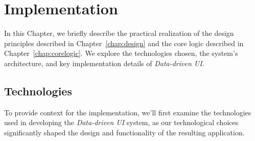 \chapter{Implementation}
\label{chap:implementation}

In this Chapter, we briefly describe the practical realization of the design principles described in Chapter~\ref{chap:design} and the core logic described in Chapter~\ref{chap:corelogic}.
We explore the technologies chosen, the system's architecture, and key implementation details of \emph{Data-driven UI}.


\section{Technologies}
\label{sec:technologies}
To provide context for the implementation, we'll first examine the technologies used in developing the \emph{Data-driven UI} system, as our technological choices significantly shaped the design and functionality of the resulting application.

